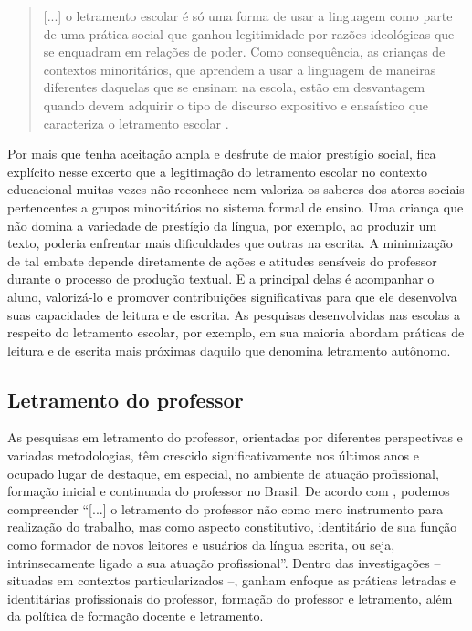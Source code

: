 \documentclass{textolivre}
\begin{document}
\begin{quote}
   [...] o letramento escolar é só uma forma de usar a linguagem como parte de uma prática social que ganhou legitimidade por razões ideológicas que se enquadram em relações de poder. Como consequência, as crianças de contextos minoritários, que aprendem a usar a linguagem de maneiras diferentes daquelas que se ensinam na escola, estão em desvantagem quando devem adquirir o tipo de discurso expositivo e ensaístico que caracteriza o letramento escolar \cite[p. 73]{zavala_quem_2010}.
\end{quote}

Por mais que tenha aceitação ampla e desfrute de maior prestígio social, fica explícito nesse excerto que a legitimação do letramento escolar no contexto educacional muitas vezes não reconhece nem valoriza os saberes dos atores sociais pertencentes a grupos minoritários no sistema formal de ensino. Uma criança que não domina a variedade de prestígio da língua, por exemplo, ao produzir um texto, poderia enfrentar mais dificuldades que outras na escrita. A minimização de tal embate depende diretamente de ações e atitudes sensíveis do professor durante o processo de produção textual. E a principal delas é acompanhar o aluno, valorizá-lo e promover contribuições significativas para que ele desenvolva suas capacidades de leitura e de escrita. As pesquisas desenvolvidas nas escolas a respeito do letramento escolar, por exemplo, em sua maioria abordam práticas de leitura e de escrita mais próximas daquilo que \textcite{street_literacy_1984, street_letramentos_2014} denomina letramento autônomo.

\subsection{Letramento do professor}\label{sec-docente}
As pesquisas em letramento do professor, orientadas por diferentes perspectivas e variadas metodologias, têm crescido significativamente nos últimos anos e ocupado lugar de destaque, em especial, no ambiente de atuação profissional, formação inicial e continuada do professor no Brasil. De acordo com \textcite[p. 21]{kleiman_projetos_2009}, podemos compreender “[...] o letramento do professor não como mero instrumento para realização do trabalho, mas como aspecto constitutivo, identitário de sua função como formador de novos leitores e usuários da língua escrita, ou seja, intrinsecamente ligado a sua atuação profissional”. Dentro das investigações – situadas em contextos particularizados –, ganham enfoque as práticas letradas e identitárias profissionais do professor, formação do professor e letramento, além da política de formação docente e letramento.
\end{document}
